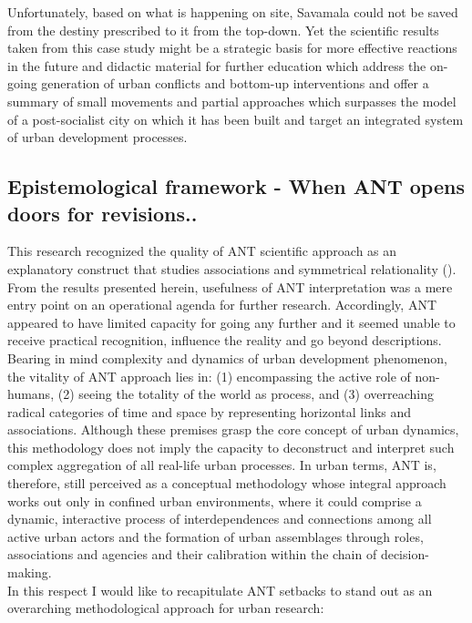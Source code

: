 \documentclass[11pt]{report}
\begin{document}
{{{Unfortunately, based on what is happening on site, Savamala could not be saved from the destiny prescribed to it from the top-down.
Yet the scientific results taken from this case study might be a strategic basis for more effective reactions in the future and didactic material for further education which address the on-going generation of urban conflicts and bottom-up interventions and offer a summary of small movements and partial approaches which surpasses the model of a post-socialist city on which it has been built and target an integrated system of urban development processes.
 
\subsection{Epistemological framework - When ANT opens doors for revisions..}
 
This research recognized the quality of ANT scientific approach as an explanatory construct that studies associations and symmetrical relationality (\href{ref}{\citealt{farias_urban_2011}}).
From the results presented herein, usefulness of ANT interpretation was a mere entry point on an operational agenda for further research.
Accordingly, ANT appeared to have limited capacity for going any further and it seemed unable to receive practical recognition, influence the reality and go beyond descriptions.
\\

Bearing in mind complexity and dynamics of urban development phenomenon, the vitality of ANT approach lies in: (1) encompassing the active role of non-humans, (2) seeing the totality of the world as process, and (3) overreaching radical categories of time and space by representing horizontal links and associations.
Although these premises grasp the core concept of urban dynamics, this methodology does not imply the capacity to deconstruct and interpret such complex aggregation of all real-life urban processes.
In urban terms, ANT is, therefore, still perceived as a conceptual methodology whose integral approach works out only in confined urban environments, where it could comprise a dynamic, interactive process of interdependences and connections among all active urban actors and the formation of urban assemblages through roles, associations and agencies and their calibration within the chain of decision-making.
\\
In this respect I would like to recapitulate ANT setbacks to stand out as an overarching methodological approach for urban research:

}}}
\end{document}
